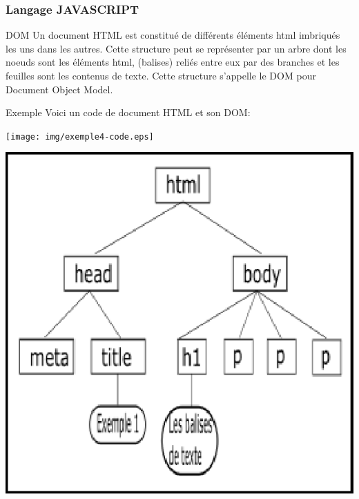 \documentclass[8pt]{beamer}
\begin{document}
\begin{frame}
\frametitle{Langage JAVASCRIPT}

\begin{block}{DOM}
Un document HTML est constitué de différents éléments html imbriqués les uns dans les autres. Cette structure peut se représenter par un arbre dont les noeuds sont les éléments html, (balises) reliés entre eux par des branches et les feuilles sont les contenus de texte. Cette structure s'appelle le DOM pour Document Object Model.
\end{block}

\begin{exampleblock}{Exemple}
Voici un code de document HTML et son DOM:\medskip

\begin{minipage}{7.7cm}
\texttt{[image: img/exemple4-code.eps]}
\end{minipage}\hfill
\begin{minipage}{4.3cm}
\includegraphics[scale=0.6]{img/dom.eps}
\end{minipage}

\end{exampleblock}
\end{frame}
\end{document}
